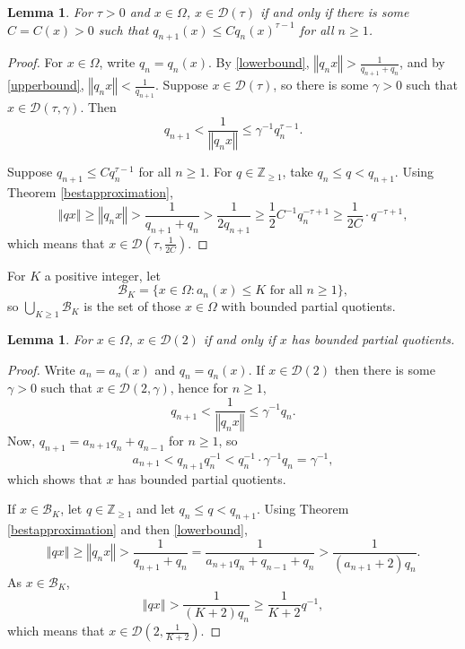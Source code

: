 \documentclass{amsart}
\newcommand{\norm}[1]{\left\Vert #1 \right\Vert}
\newtheorem{lemma}[theorem]{Lemma}
\begin{document}
\begin{lemma}
For $\tau>0$ and $x \in \Omega$, $x \in \mathcal{D}(\tau)$ if and only if there is some
$C=C(x)>0$ such that $q_{n+1}(x) \leq C q_n(x)^{\tau-1}$ for all $n \geq 1$.
\label{Dtau}
\end{lemma}
\begin{proof}
For $x \in \Omega$, write $q_n=q_n(x)$.
By \eqref{lowerbound}, $\norm{q_n x} > \frac{1}{q_{n+1}+q_n}$, 
and by \eqref{upperbound}, $\norm{q_n x} < \frac{1}{q_{n+1}}$.
Suppose $x \in \mathcal{D}(\tau)$, so there is some $\gamma>0$ such that $x \in \mathcal{D}(\tau,\gamma)$. 
Then
\[
q_{n+1} < \frac{1}{\norm{q_n x}} \leq \gamma^{-1} q_n^{\tau-1}.
\]

Suppose $q_{n+1} \leq C q_n^{\tau-1}$ for all $n \geq 1$. For $q \in \mathbb{Z}_{\geq 1}$, take $q_n \leq q < q_{n+1}$.
Using Theorem \ref{bestapproximation},
\[
\norm{qx} \geq \norm{q_n x} > \frac{1}{q_{n+1}+q_n} > \frac{1}{2q_{n+1}} \geq \frac{1}{2} C^{-1} q_n^{-\tau+1}
\geq \frac{1}{2C} \cdot q^{-\tau+1},
\]
which means that $x \in \mathcal{D}(\tau,\frac{1}{2C})$. 
\end{proof}


For $K$ a positive integer, let 
\[
\mathcal{B}_K = \{x \in \Omega: \textrm{$a_n(x) \leq K$ for all $n \geq 1$}\},
\]
so $\bigcup_{K \geq 1} \mathcal{B}_K$ is the set of those $x \in \Omega$ with bounded partial quotients.

\begin{lemma}
For $x \in \Omega$, $x \in \mathcal{D}(2)$ if and only if $x$ has bounded partial quotients.
\end{lemma}
\begin{proof}
Write $a_n=a_n(x)$ and $q_n=q_n(x)$.
If $x \in \mathcal{D}(2)$ then there is some $\gamma>0$ such that $x \in \mathcal{D}(2,\gamma)$, hence for $n \geq 1$,
\[
q_{n+1}<\frac{1}{\norm{q_n x}} \leq \gamma^{-1} q_n.
\]
Now, $q_{n+1} = a_{n+1} q_n + q_{n-1}$ for $n \geq 1$, so
\[
a_{n+1}  < q_{n+1} q_n^{-1}  < q_n^{-1} \cdot \gamma^{-1} q_n
=\gamma^{-1},
\]
which shows that $x$ has bounded partial quotients.

If $x \in \mathcal{B}_K$, let $q \in \mathbb{Z}_{\geq 1}$ and let $q_n \leq q < q_{n+1}$. 
Using Theorem \ref{bestapproximation} and then \eqref{lowerbound},
\[
\norm{qx} \geq \norm{q_n x} > \frac{1}{q_{n+1}+q_n}
=\frac{1}{a_{n+1} q_n + q_{n-1} + q_n}
>\frac{1}{(a_{n+1}+2)q_n}.
\]
As $x \in \mathcal{B}_K$,
\[
\norm{qx} > \frac{1}{(K+2) q_n} \geq \frac{1}{K+2} q^{-1},
\]
which means that $x \in \mathcal{D}(2,\frac{1}{K+2})$. 
\end{proof}
\end{document}
